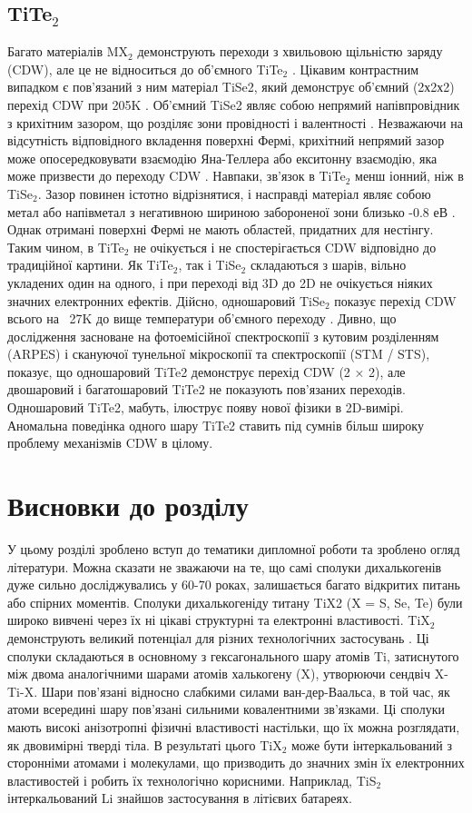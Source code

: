 \subsection{TiTe$_2$}
Багато матеріалів MX$_2$ демонструють переходи з хвильовою щільністю заряду (CDW), але це не відноситься до об'ємного TiTe$_2$ \cite{PhysRevB29,TiTe2_2, TiTe2_3, TiTe2_4}. Цікавим контрастним випадком є пов'язаний з ним матеріал TiSe2, який демонструє об'ємний (2х2х2) перехід CDW при 205K \cite{TiTe2_5}. Об'ємний TiSe2 являє собою непрямий напівпровідник з крихітним зазором, що розділяє зони провідності і валентності \cite{TiTe2_6}. Незважаючи на відсутність відповідного вкладення поверхні Фермі, крихітний непрямий зазор може опосередковувати взаємодію Яна-Теллера або екситонну взаємодію, яка може призвести до переходу CDW \cite{TiTe2_6}. Навпаки, зв'язок в TiTe$_2$ менш іонний, ніж в TiSe$_2$. Зазор повинен істотно відрізнятися, і насправді матеріал являє собою метал або напівметал з негативною шириною забороненої зони близько -0.8 $еВ$ \cite{PhysRevB.54.2453}. Однак отримані поверхні Фермі не мають областей, придатних для нестінгу. Таким чином, в TiTe$_2$ не очікується і не спостерігається CDW відповідно до традиційної картини. Як TiTe$_2$, так і TiSe$_2$ складаються з шарів, вільно укладених один на одного, і при переході від 3D до 2D не очікується ніяких значних електронних ефектів. Дійсно, одношаровий TiSe$_2$ показує перехід CDW всього на ~27K до вище температури об'ємного переходу \cite{TiTe2_7}.
Дивно, що дослідження засноване на фотоемісійної спектроскопії з кутовим розділенням (ARPES) і скануючої тунельної мікроскопії та спектроскопії (STM / STS), показує, що одношаровий TiTe2 демонструє перехід CDW (2 × 2), але двошаровий і багатошаровий TiTe2 не показують пов'язаних переходів. Одношаровий TiTe2, мабуть, ілюструє появу нової фізики в 2D-вимірі. Аномальна поведінка одного шару TiTe2 ставить під сумнів більш широку проблему механізмів CDW в цілому.
\section{Висновки до розділу} 
У цьому розділі зроблено вступ до тематики дипломної роботи та зроблено огляд літератури. Можна сказати не зважаючи на те, що самі сполуки дихалькогенів дуже сильно досліджувались у 60-70 роках, залишається багато відкритих питань або спірних моментів. 
Сполуки дихалькогеніду титану TiX2 (X = S, Se, Te) були широко вивчені через їх ні цікаві структурні та електронні властивості. TiX$_2$ демонструють великий потенціал для різних технологічних застосувань \cite{Yoffe}. Ці сполуки складаються в основному з гексагонального шару атомів Ti, затиснутого між двома аналогічними шарами атомів халькогену (X), утворюючи  сендвіч X-Ti-X. Шари пов'язані відносно слабкими силами ван-дер-Ваальса, в той час, як атоми всередині шару пов'язані сильними ковалентними зв'язками. Ці сполуки мають високі анізотропні фізичні властивості настільки, що їх можна розглядати, як двовимірні тверді тіла. В результаті цього TiX$_2$ може бути інтеркальований з сторонніми атомами і молекулами, що призводить до значних змін їх електронних властивостей і робить їх технологічно корисними. Наприклад, TiS$_2$ інтеркальований Li знайшов застосування в літієвих батареях.

